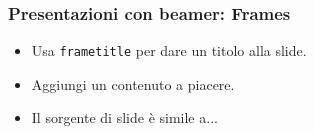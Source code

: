 \begin{frame}
  \frametitle{Presentazioni con beamer: Frames}
  \begin{itemize}
    \item Usa \texttt{frametitle} per dare un titolo alla slide.
    \item Aggiungi un contenuto a piacere.
    \item Il sorgente di  slide \`e simile a...
  \end{itemize}
\end{frame}